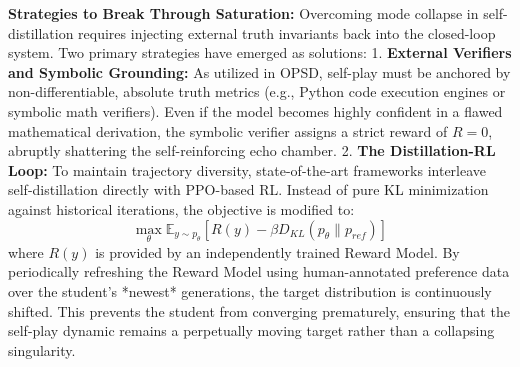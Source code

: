 \textbf{Strategies to Break Through Saturation:} 
Overcoming mode collapse in self-distillation requires injecting external truth invariants back into the closed-loop system. Two primary strategies have emerged as solutions:
1. \textbf{External Verifiers and Symbolic Grounding:} As utilized in OPSD, self-play must be anchored by non-differentiable, absolute truth metrics (e.g., Python code execution engines or symbolic math verifiers). Even if the model becomes highly confident in a flawed mathematical derivation, the symbolic verifier assigns a strict reward of $R=0$, abruptly shattering the self-reinforcing echo chamber.
2. \textbf{The Distillation-RL Loop:} To maintain trajectory diversity, state-of-the-art frameworks interleave self-distillation directly with PPO-based RL. Instead of pure KL minimization against historical iterations, the objective is modified to:
\begin{equation}
    \max_\theta \mathbb{E}_{y \sim p_\theta} \left[ R(y) - \beta D_{KL}(p_\theta \parallel p_{ref}) \right]
\end{equation}
where $R(y)$ is provided by an independently trained Reward Model. By periodically refreshing the Reward Model using human-annotated preference data over the student's *newest* generations, the target distribution is continuously shifted. This prevents the student from converging prematurely, ensuring that the self-play dynamic remains a perpetually moving target rather than a collapsing singularity.
